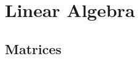 \documentclass[]{article}
\newlength{\fixmewidth}
\newcommand{\fixme}[1]{%
  \begin{minipage}[c]{\fixmewidth}%
  \todo[color=green!40,inline]{\textsc{fixme:} #1}%
  \end{minipage}}
\begin{document}


\section{Linear Algebra}

\subsection{Matrices}
\end{document}
